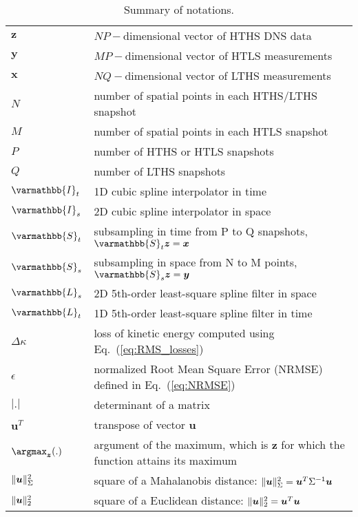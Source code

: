 \begin{table}
	\centering
	\caption{\label{tab:summary_of_notations}Summary of notations.}
	\begin{tabulary}{\textwidth}{l p{11cm}} \toprule
	$ \boldsymbol{z} $  & $ NP- $dimensional vector of HTHS DNS data \\
	$ \boldsymbol{y} $  & $ MP- $dimensional vector of HTLS measurements \\
	$ \boldsymbol{x} $  & $ NQ- $dimensional vector of LTHS measurements \\
	$ N $  & number of spatial points in each HTHS/LTHS snapshot \\
	$ M $  & number of spatial points in each HTLS snapshot \\
	$ P $  & number of HTHS or HTLS snapshots \\
	$ Q $  & number of LTHS snapshots \\				
	$ \varmathbb{I}_t $ & 1D cubic spline interpolator in time\\
	$ \varmathbb{I}_s $ & 2D cubic spline interpolator in space\\
	$ \varmathbb{S}_t $ & subsampling in time from P to Q snapshots, $ \varmathbb{S}_t \boldsymbol{z} = \boldsymbol{x}$ \\
	$ \varmathbb{S}_s $ & subsampling in space from N to M points, $ \varmathbb{S}_s \boldsymbol{z} = \boldsymbol{y}$ \\
	$ \varmathbb{L}_s $ & 2D 5th-order least-square spline filter in space \\
	$ \varmathbb{L}_t $ & 1D 5th-order least-square spline filter in time \\
	$ \Delta\kappa $ & loss of kinetic energy computed using Eq.~(\ref{eq:RMS_losses}) \\	
	$ \epsilon $ & normalized Root Mean Square Error (NRMSE) defined in Eq.~(\ref{eq:NRMSE}) \\
	$ |.| $ & determinant of a matrix \\
	$\boldsymbol{u}^T$ & transpose of vector $ \boldsymbol{u} $ \\	
	$\argmax_{\boldsymbol{z}}(.)$ & argument of the maximum,  which is $ \boldsymbol{z} $ for which the function attains its maximum\\		
	$ \Arrowvert \boldsymbol{u} \Arrowvert^2_{\Sigma} $ & square of a Mahalanobis distance: $ \Arrowvert \boldsymbol{u} \Arrowvert^2_{\Sigma} = \boldsymbol{u}^T \Sigma^{-1} \boldsymbol{u}$\\
	$ \Arrowvert \boldsymbol{u} \Arrowvert^2_2 $ & square of a Euclidean distance: $ \Arrowvert \boldsymbol{u} \Arrowvert^2_2 = \boldsymbol{u}^T \boldsymbol{u}$\\	

\end{tabulary}
\end{table}
